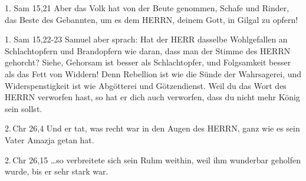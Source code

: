 \documentclass[aspectratio=43]{beamer}
\begin{document}
\begin{frame}  
    \vspace*{1cm}
        \begin{exampleblock}{1. Sam 15,21}
            \color{black}            
            Aber das Volk hat von der Beute genommen, Schafe und Rinder, das Beste des Gebannten, um es dem HERRN, deinem Gott, in Gilgal zu opfern!
        \end{exampleblock}  
    \vspace*{1cm}
\end{frame}
\begin{frame}  
    \vspace*{1cm}
        \begin{exampleblock}{1. Sam 15,22-23}
            \color{black}            
            Samuel aber sprach: Hat der HERR dasselbe Wohlgefallen an Schlachtopfern und Brandopfern wie daran, dass man der Stimme des HERRN gehorcht? Siehe, Gehorsam ist besser als Schlachtopfer, und Folgsamkeit besser als das Fett von Widdern! Denn Rebellion ist wie die Sünde der Wahrsagerei, und Widerspenstigkeit ist wie Abgötterei und Götzendienst. Weil du das Wort des HERRN verworfen hast, so hat er dich auch verworfen, dass du nicht mehr König sein sollst.
        \end{exampleblock}  
    \vspace*{1cm}
\end{frame}
\begin{frame}  
    \vspace*{1cm}
        \begin{exampleblock}{2.\,Chr 26,4}
            \color{black}            
            Und er tat, was recht war in den Augen des HERRN, ganz wie es sein Vater Amazja getan hat.
        \end{exampleblock}  
    \vspace*{1cm}
\end{frame}
\begin{frame}  
    \vspace*{1cm}
        \begin{exampleblock}{2.\,Chr 26,15}
            \color{black}            
            \dots so verbreitete sich sein Ruhm weithin, weil ihm wunderbar geholfen wurde, bis er sehr stark war.
        \end{exampleblock}  
    \vspace*{1cm}
\end{frame}
\end{document}
